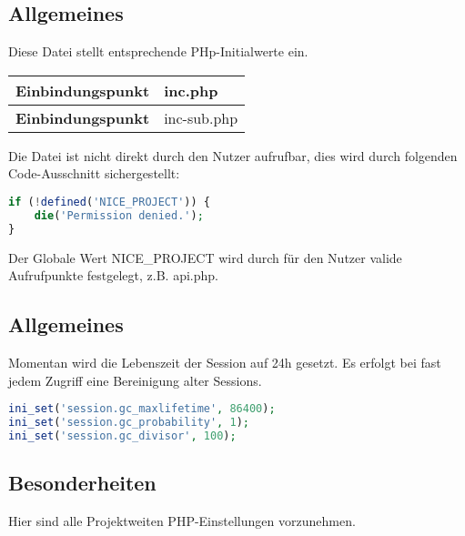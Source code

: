 \subsection{Allgemeines} Diese Datei stellt entsprechende PHp-Initialwerte ein.
\begin{table}[H]
	\begin{tabular}{|c|p{11cm}|}
		\hline
		\textbf{Einbindungspunkt} & inc.php \\ \hline
		\textbf{Einbindungspunkt} & inc-sub.php \\ \hline
	\end{tabular}
\end{table}
Die Datei ist nicht direkt durch den Nutzer aufrufbar, dies wird durch folgenden Code-Ausschnitt sichergestellt:
\begin{lstlisting}[language=php]
if (!defined('NICE_PROJECT')) {
	die('Permission denied.');
}
\end{lstlisting}
Der Globale Wert {\glqq NICE\_PROJECT\grqq} wird durch für den Nutzer valide Aufrufpunkte festgelegt, z.B. {\glqq api.php\grqq}.
\newpage
\subsection{Allgemeines}
Momentan wird die Lebenszeit der Session auf 24h gesetzt. Es erfolgt bei fast jedem Zugriff eine Bereinigung alter Sessions.
\begin{lstlisting}[language=php]
ini_set('session.gc_maxlifetime', 86400);
ini_set('session.gc_probability', 1);
ini_set('session.gc_divisor', 100);
\end{lstlisting}
\subsection{Besonderheiten}
Hier sind alle Projektweiten PHP-Einstellungen vorzunehmen.